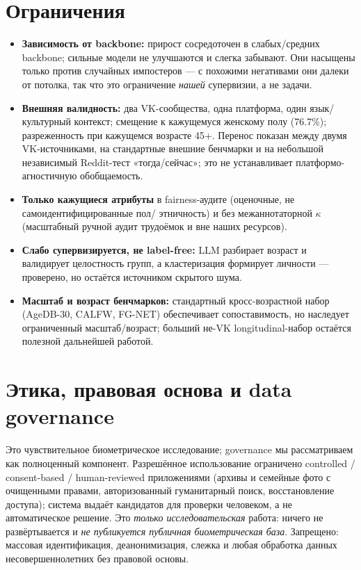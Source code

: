 \documentclass[10pt,twocolumn,letterpaper]{article}
\begin{document}
\section{Ограничения}\label{sec:limitations}
\begin{itemize}
\item \textbf{Зависимость от backbone:} прирост сосредоточен в слабых/средних backbone; сильные модели не улучшаются и слегка забывают. Они насыщены только против случайных импостеров — с похожими негативами они далеки от потолка, так что это ограничение \emph{нашей} супервизии, а не задачи.
\item \textbf{Внешняя валидность:} два VK-сообщества, одна платформа, один язык/культурный контекст;
смещение к кажущемуся женскому полу (76.7\%); разреженность при кажущемся возрасте 45+. Перенос показан
между двумя VK-источниками, на стандартные внешние бенчмарки и на небольшой независимый Reddit-тест
«тогда/сейчас»; это не устанавливает платформо-агностичную обобщаемость.
\item \textbf{Только кажущиеся атрибуты} в fairness-аудите (оценочные, не самоидентифицированные пол/
этничность) и без межаннотаторной $\kappa$ (масштабный ручной аудит трудоёмок и вне наших ресурсов).
\item \textbf{Слабо супервизируется, не label-free:} LLM разбирает возраст и валидирует целостность групп,
а кластеризация формирует личности — проверено, но остаётся источником скрытого шума.
\item \textbf{Масштаб и возраст бенчмарков:} стандартный кросс-возрастной набор (AgeDB-30, CALFW, FG-NET)
обеспечивает сопоставимость, но наследует ограниченный масштаб/возраст; больший не-VK longitudinal-набор
остаётся полезной дальнейшей работой.
\end{itemize}

\section*{Этика, правовая основа и data governance}
Это чувствительное биометрическое исследование; governance мы рассматриваем как полноценный компонент.
Разрешённое использование ограничено controlled / consent-based / human-reviewed приложениями (архивы и
семейные фото с очищенными правами, авторизованный гуманитарный поиск, восстановление доступа); система
выдаёт кандидатов для проверки человеком, а не автоматическое решение. Это \emph{только исследовательская}
работа: ничего не развёртывается и \emph{не публикуется публичная биометрическая база}. Запрещено:
массовая идентификация, деанонимизация, слежка и любая обработка данных несовершеннолетних без правовой
основы.
\end{document}
